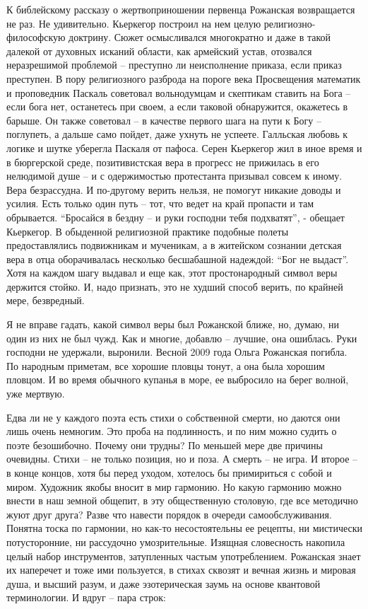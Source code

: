 \documentclass[12pt,a5paper,twoside]{article}
\begin{document}
К библейскому рассказу о жертвоприношении первенца Рожанская возвращается не раз. Не удивительно. 
Кьеркегор построил на нем целую религиозно-философскую доктрину. Сюжет осмысливался многократно 
и даже в такой далекой от духовных исканий области, как армейский устав, отозвался неразрешимой 
проблемой -- преступно ли неисполнение приказа, если приказ преступен. В пору религиозного 
разброда на пороге века Просвещения математик и проповедник Паскаль советовал вольнодумцам 
и скептикам ставить на Бога -- если бога нет, останетесь при своем, а если таковой обнаружится, 
окажетесь в барыше. Он также советовал -- в качестве первого шага на пути к Богу -- поглупеть, 
а дальше само пойдет, даже ухнуть не успеете. Галльская любовь к логике и шутке уберегла Паскаля 
от пафоса. Серен Кьеркегор жил в иное время и в бюргерской среде, позитивистская вера в прогресс 
не прижилась в его нелюдимой душе -- и с одержимостью протестанта призывал совсем к иному. 
Вера безрассудна. И по-другому верить нельзя, не помогут никакие доводы и усилия. Есть 
только один путь -- тот, что ведет на край пропасти и там обрывается. ``Бросайся в бездну -- 
и руки господни тебя подхватят'', - обещает Кьеркегор. В обыденной религиозной практике подобные 
полеты предоставлялись подвижникам и мученикам, а в житейском сознании детская вера в 
отца оборачивалась несколько бесшабашной надеждой: ``Бог не выдаст''. Хотя на каждом 
шагу выдавал и еще как, этот простонародный символ веры держится стойко. И, надо признать, 
это не худший способ верить, по крайней мере, безвредный.
 
Я не вправе гадать, какой символ веры был Рожанской ближе, но, 
думаю, ни один из них не был чужд. Как и многие, добавлю -- лучшие, она ошиблась. Руки 
господни не удержали, выронили. Весной 2009 года Ольга Рожанская погибла. По народным 
приметам, все хорошие пловцы тонут, а она была хорошим пловцом. 
И во время обычного купанья в море, ее выбросило на берег волной, уже мертвую.

Едва ли не у каждого поэта есть стихи о собственной смерти, но даются они лишь очень 
немногим. Это проба на подлинность, и по ним можно судить о поэте безошибочно. Почему они трудны? По 
меньшей мере две причины очевидны. Стихи -- не только позиция, но и поза. А смерть -- не 
игра. И второе -- в конце концов, хотя бы перед уходом, хотелось бы примириться с собой и миром. Художник 
якобы вносит в мир гармонию. Но какую гармонию можно внести в наш земной общепит, в эту 
общественную столовую, где все методично жуют друг друга? Разве что навести порядок в 
очереди самообслуживания. Понятна тоска по гармонии, но как-то несостоятельны ее рецепты, ни мистически 
потусторонние, ни рассудочно умозрительные. Изящная словесность накопила целый набор инструментов, 
затупленных частым употреблением. Рожанская знает их наперечет и тоже ими пользуется, в стихах 
сквозят и вечная жизнь и мировая душа, и высший разум, и даже эзотерическая заумь на основе квантовой терминологии. И вдруг -- пара строк:
\end{document}
